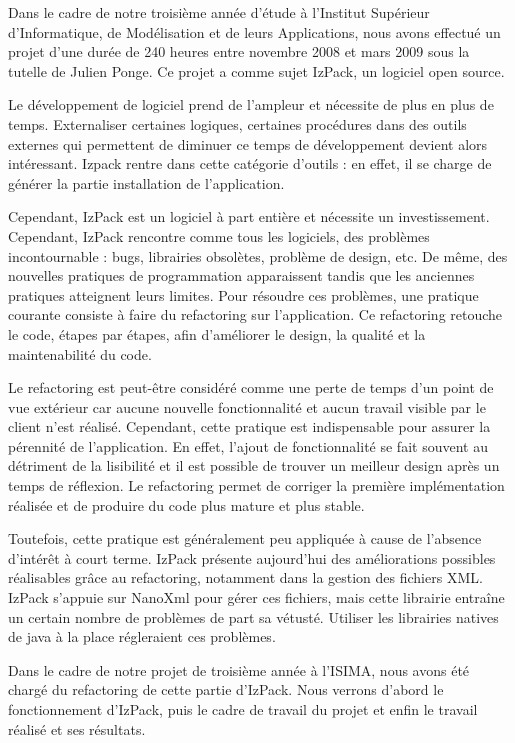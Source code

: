 Dans le cadre de notre troisième année d'étude à l'Institut Supérieur d'Informatique, de Modélisation et de leurs Applications, nous avons effectué un projet d'une durée de 240 heures entre novembre 2008 et mars 2009 sous la tutelle de Julien Ponge.
Ce projet a comme sujet IzPack, un logiciel open source.

Le développement de logiciel prend de l'ampleur et nécessite de plus en plus de temps.
Externaliser certaines logiques, certaines procédures dans des outils externes qui permettent de diminuer ce temps de développement devient alors intéressant.
Izpack rentre dans cette catégorie d'outils : en effet, il se charge de générer la partie installation de l'application.

Cependant, IzPack est un logiciel à part entière et nécessite un investissement.
Cependant, IzPack rencontre comme tous les logiciels, des problèmes incontournable : bugs, librairies obsolètes, problème de design, etc.
De même, des nouvelles pratiques de programmation apparaissent tandis que les anciennes pratiques atteignent leurs limites.
Pour résoudre ces problèmes, une pratique courante consiste à faire du refactoring sur l'application.
Ce refactoring retouche le code, étapes par étapes, afin d'améliorer le design, la qualité et la maintenabilité du code.

Le refactoring est peut-être considéré comme une perte de temps d'un point de vue extérieur car aucune nouvelle fonctionnalité et aucun travail visible par le client n'est réalisé.
Cependant, cette pratique est indispensable pour assurer la pérennité de l'application.
En effet, l'ajout de fonctionnalité se fait souvent au détriment de la lisibilité et il est possible de trouver un meilleur design après un temps de réflexion.
Le refactoring permet de corriger la première implémentation réalisée et de produire du code plus mature et plus stable.

Toutefois, cette pratique est généralement peu appliquée à cause de l'absence d'intérêt à court terme.
IzPack présente aujourd'hui des améliorations possibles réalisables grâce au refactoring, notamment dans la gestion des fichiers XML.
IzPack s'appuie sur NanoXml pour gérer ces fichiers, mais cette librairie entraîne un certain nombre de problèmes de part sa vétusté.
Utiliser les librairies natives de java à la place régleraient ces problèmes.

Dans le cadre de notre projet de troisième année à l'ISIMA, nous avons été chargé du refactoring de cette partie d'IzPack.
Nous verrons d'abord le fonctionnement d'IzPack, puis le cadre de travail du projet et enfin le travail réalisé et ses résultats.